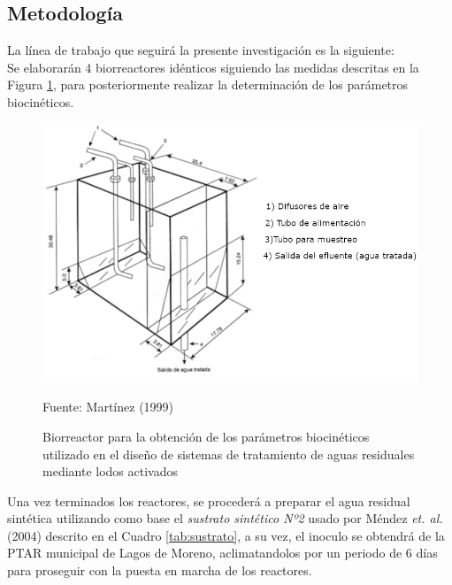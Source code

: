 \subsection*{Metodología}
La línea de trabajo que seguirá la presente investigación es la siguiente:\\
Se elaborarán 4 biorreactores idénticos siguiendo las medidas descritas en la Figura \ref{fig:reactor}, para posteriormente realizar la determinación de los parámetros biocinéticos.
\begin{figure}[!h]
	\centering
	\includegraphics[scale=0.3]{Reactor.png}
	\caption{Biorreactor para la obtención de los parámetros biocinéticos utilizado en el diseño de sistemas de tratamiento de aguas residuales mediante lodos activados}
	\label{fig:reactor}
	\small{Fuente: Martínez (1999)}
\end{figure}
Una vez terminados los reactores, se procederá a preparar el agua residual sintética utilizando como base el \emph{sustrato sintético Nº2} usado por Méndez \textit{et. al.} (2004) \emph{\citep{mendez2004}} descrito en el Cuadro \ref{tab:sustrato}, a su vez, el inoculo se obtendrá de la PTAR municipal de Lagos de Moreno, aclimatandolos por un periodo de 6 días para proseguir con la puesta en marcha de los reactores.
